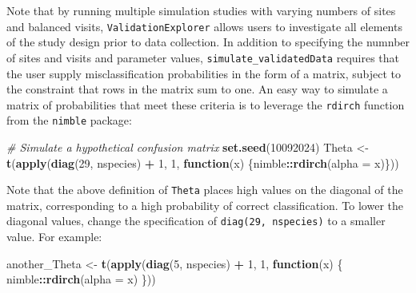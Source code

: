 \documentclass[
]{article}
\newenvironment{Shaded}{\begin{snugshade}}{\end{snugshade}}
\newcommand{\AttributeTok}[1]{\textcolor[rgb]{0.13,0.29,0.53}{#1}}
\newcommand{\CommentTok}[1]{\textcolor[rgb]{0.56,0.35,0.01}{\textit{#1}}}
\newcommand{\ControlFlowTok}[1]{\textcolor[rgb]{0.13,0.29,0.53}{\textbf{#1}}}
\newcommand{\DecValTok}[1]{\textcolor[rgb]{0.00,0.00,0.81}{#1}}
\newcommand{\FunctionTok}[1]{\textcolor[rgb]{0.13,0.29,0.53}{\textbf{#1}}}
\newcommand{\NormalTok}[1]{#1}
\newcommand{\OtherTok}[1]{\textcolor[rgb]{0.56,0.35,0.01}{#1}}
\newcommand{\SpecialCharTok}[1]{\textcolor[rgb]{0.81,0.36,0.00}{\textbf{#1}}}
\begin{document}
\linespread{1}

Note that by running multiple simulation studies with varying numbers of sites and balanced visits, \texttt{ValidationExplorer} allows users to investigate all elements of the study design prior to data collection. In addition to specifying the numnber of sites and visits and parameter values, \texttt{simulate\_validatedData} requires that the user supply misclassification probabilities in the form of a matrix, subject to the constraint that rows in the matrix sum to one. An easy way to simulate a matrix of probabilities that meet these criteria is to leverage the \texttt{rdirch} function from the \texttt{nimble} package:

\linespread{1}

\begin{Shaded}
\begin{Highlighting}[]
\CommentTok{\# Simulate a hypothetical confusion matrix }
\FunctionTok{set.seed}\NormalTok{(}\DecValTok{10092024}\NormalTok{) }
\NormalTok{Theta }\OtherTok{\textless{}{-}} \FunctionTok{t}\NormalTok{(}\FunctionTok{apply}\NormalTok{(}\FunctionTok{diag}\NormalTok{(}\DecValTok{29}\NormalTok{, nspecies) }\SpecialCharTok{+} \DecValTok{1}\NormalTok{, }\DecValTok{1}\NormalTok{, }\ControlFlowTok{function}\NormalTok{(x) \{nimble}\SpecialCharTok{::}\FunctionTok{rdirch}\NormalTok{(}\AttributeTok{alpha =}\NormalTok{ x)\}))}
\end{Highlighting}
\end{Shaded}

\linespread{1}

Note that the above definition of \texttt{Theta} places high values on the diagonal of the matrix, corresponding to a high probability of correct classification. To lower the diagonal values, change the specification of \texttt{diag(29,\ nspecies)} to a smaller value. For example:

\linespread{1}

\begin{Shaded}
\begin{Highlighting}[]
\NormalTok{another\_Theta }\OtherTok{\textless{}{-}} \FunctionTok{t}\NormalTok{(}\FunctionTok{apply}\NormalTok{(}\FunctionTok{diag}\NormalTok{(}\DecValTok{5}\NormalTok{, nspecies) }\SpecialCharTok{+} \DecValTok{1}\NormalTok{, }\DecValTok{1}\NormalTok{, }\ControlFlowTok{function}\NormalTok{(x) \{}
\NormalTok{    nimble}\SpecialCharTok{::}\FunctionTok{rdirch}\NormalTok{(}\AttributeTok{alpha =}\NormalTok{ x)}
\NormalTok{  \}))}
\end{Highlighting}
\end{Shaded}
\end{document}
